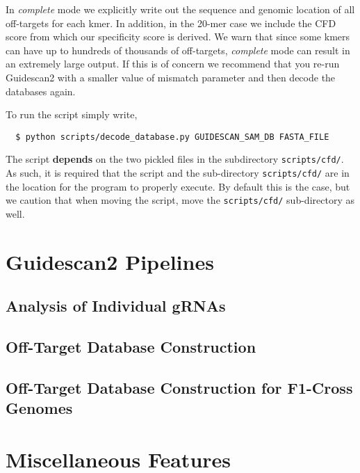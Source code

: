 \documentclass[11pt]{article}
\begin{document}
In {\it complete} mode we explicitly write out the sequence and
genomic location of all off-targets for each kmer. In addition, in the
20-mer case we include the CFD score from which our specificity score
is derived. We warn that since some kmers can have up to hundreds of
thousands of off-targets, {\it complete} mode can result in an
extremely large output. If this is of concern we recommend that you
re-run Guidescan2 with a smaller value of mismatch parameter and then
decode the databases again.

To run the script simply write,
\begin{verbatim}
  $ python scripts/decode_database.py GUIDESCAN_SAM_DB FASTA_FILE 
\end{verbatim}
The script \textbf{depends} on the two pickled files in the
subdirectory \texttt{scripts/cfd/}. As such, it is required that the
script and the sub-directory \texttt{scripts/cfd/} are in the location
for the program to properly execute. By default this is the
case, but we caution that when moving the script, move the
\texttt{scripts/cfd/} sub-directory as well.

\section{Guidescan2 Pipelines}
\subsection{Analysis of Individual gRNAs}

\subsection{Off-Target Database Construction}
\subsection{Off-Target Database Construction for F1-Cross Genomes}

\section{Miscellaneous Features}
\end{document}
